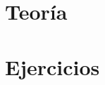 \documentclass[fontsize=12pt]{scrartcl}
\begin{document}

\thispagestyle{empty}
\tableofcontents
\newpage


\part{Teoría}

\newpage

\part{Ejercicios}

\end{document}
